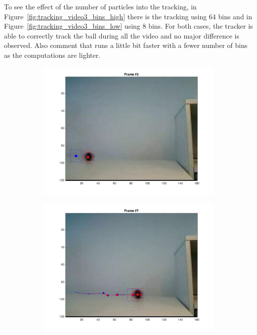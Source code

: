 \documentclass{ethz_report}
\begin{document}
To see the effect of the number of particles into the tracking, in Figure~\ref{fig:tracking_video3_bins_high} there is the tracking using 64 bins and in Figure~\ref{fig:tracking_video3_bins_low} using 8 bins. For both cases, the tracker is able to correctly track the ball during all the video and no major difference is observed. Also comment that runs a little bit faster with a fewer number of bins as the computations are lighter.

\begin{figure}[h]
    \centering
    \begin{subfigure}[b]{.25\textwidth}
        \centering
        \includegraphics[width=1\linewidth]{images/video3_bins_high_1}
    \end{subfigure}%
    \begin{subfigure}[b]{.25\textwidth}
        \centering
        \includegraphics[width=1\linewidth]{images/video3_bins_high_6}

\end{subfigure}
\end{figure}
\end{document}
